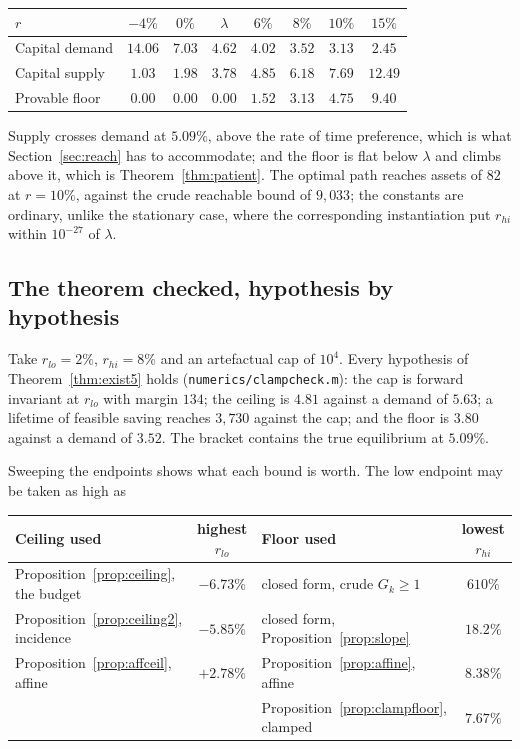\begingroup\small
\begin{center}
\begin{tabular}{@{}lccccccc@{}}
\toprule
$r$ & $-4\%$ & $0\%$ & $\lambda$ & $6\%$ & $8\%$ & $10\%$ & $15\%$ \\
\midrule
Capital demand & $14.06$ & $7.03$ & $4.62$ & $4.02$ & $3.52$ & $3.13$ & $2.45$ \\
Capital supply & $1.03$ & $1.98$ & $3.78$ & $4.85$ & $6.18$ & $7.69$ & $12.49$ \\
Provable floor & $0.00$ & $0.00$ & $0.00$ & $1.52$ & $3.13$ & $4.75$ & $9.40$ \\
\bottomrule
\end{tabular}
\end{center}
\endgroup

Supply crosses demand at $5.09\%$, above the rate of time preference, which is what
Section~\ref{sec:reach} has to accommodate; and the floor is flat below $\lambda$ and climbs above
it, which is Theorem~\ref{thm:patient}. The optimal path reaches assets of $82$ at $r=10\%$,
against the crude reachable bound of $9{,}033$; the constants are ordinary, unlike the stationary
case, where the corresponding instantiation put $r_{hi}$ within $10^{-27}$ of $\lambda$.

\subsection{The theorem checked, hypothesis by hypothesis}\label{sec:sharpnum}

Take $r_{lo}=2\%$, $r_{hi}=8\%$ and an artefactual cap of $10^4$. Every hypothesis of
Theorem~\ref{thm:exist5} holds (\texttt{numerics/clampcheck.m}): the cap is forward invariant at
$r_{lo}$ with margin $134$; the ceiling is $4.81$ against a demand of $5.63$; a lifetime of
feasible saving reaches $3{,}730$ against the cap; and the floor is $3.80$ against a demand of
$3.52$. The bracket contains the true equilibrium at $5.09\%$.

Sweeping the endpoints shows what each bound is worth. The low endpoint may be taken as high as

\begingroup\small
\begin{center}
\begin{tabular}{@{}lc@{\qquad}lc@{}}
\toprule
Ceiling used & highest $r_{lo}$ & Floor used & lowest $r_{hi}$\\
\midrule
Proposition~\ref{prop:ceiling}, the budget & $-6.73\%$
  & closed form, crude $G_k\ge1$ & $610\%$\\
Proposition~\ref{prop:ceiling2}, incidence & $-5.85\%$
  & closed form, Proposition~\ref{prop:slope} & $18.2\%$\\
Proposition~\ref{prop:affceil}, affine & $+2.78\%$
  & Proposition~\ref{prop:affine}, affine & $8.38\%$\\
& & Proposition~\ref{prop:clampfloor}, clamped & $7.67\%$\\
\bottomrule
\end{tabular}
\end{center}
\endgroup

